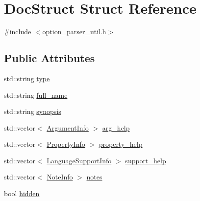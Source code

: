 \hypertarget{structDocStruct}{\section{Doc\-Struct Struct Reference}
\label{structDocStruct}
}


{\ttfamily \#include $<$option\-\_\-parser\-\_\-util.\-h$>$}

\subsection*{Public Attributes}
\begin{DoxyCompactItemize}
\item 
std\-::string \hyperlink{structDocStruct_a91a29979c17e21f606349d0450a75e8e}{type}
\item 
std\-::string \hyperlink{structDocStruct_ab8f7dbf05b414a94c4378b783270cf1e}{full\-\_\-name}
\item 
std\-::string \hyperlink{structDocStruct_af808bfe418f51eacf0c1101513d3677f}{synopsis}
\item 
std\-::vector$<$ \hyperlink{structArgumentInfo}{Argument\-Info} $>$ \hyperlink{structDocStruct_aaf770bc3b8bbe01f8a0a0e859fdf0c92}{arg\-\_\-help}
\item 
std\-::vector$<$ \hyperlink{structPropertyInfo}{Property\-Info} $>$ \hyperlink{structDocStruct_a9eb6464706fd52b152dd73560919b41b}{property\-\_\-help}
\item 
std\-::vector$<$ \hyperlink{structLanguageSupportInfo}{Language\-Support\-Info} $>$ \hyperlink{structDocStruct_a5ab754df0511c5d44c26063e59472b6b}{support\-\_\-help}
\item 
std\-::vector$<$ \hyperlink{structNoteInfo}{Note\-Info} $>$ \hyperlink{structDocStruct_a511a4d9eac3411c758b2ea6817421692}{notes}
\item 
bool \hyperlink{structDocStruct_af440a5475a918a0ab6cac5ea7dc38421}{hidden}
\end{DoxyCompactItemize}


